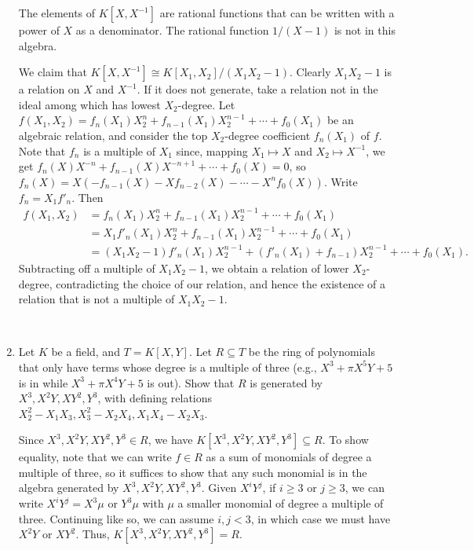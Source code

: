 \documentclass[12pt]{amsart}
\newcommand{\solution}[1]{\ifthenelse {\equal{\displaysol}{1}} {\begin{framed}{\color{meretale}\noindent #1}\end{framed}} { \ }}
\newcommand\itemB{\stepcounter{enumi}\item[(\theenumi)]}
\begin{document}
\begin{enumerate}
\solution{The elements of $K[X,X^{-1}]$ are rational functions that can be written with a power of $X$ as a denominator. The rational function $1/(X-1)$ is not in this algebra.

We claim that $K[X,X^{-1}]\cong K[X_1,X_2]/(X_1 X_2-1)$. Clearly $X_1 X_2-1$ is a relation on $X$ and $X^{-1}$. If it does not generate, take a relation not in the ideal among which has lowest $X_2$-degree. Let $f(X_1,X_2)= f_n(X_1) X_2^n + f_{n-1}(X_1) X_2^{n-1} + \cdots + f_0(X_1)$ be an algebraic relation, and consider the top $X_2$-degree coefficient $f_n(X_1)$ of $f$. Note that $f_n$ is a multiple of $X_1$ since, mapping $X_1\mapsto X$ and $X_2\mapsto X^{-1}$, we get $f_n(X) X^{-n} + f_{n-1}(X) X^{-n+1} + \cdots +f_0(X)=0$, so $f_n(X) = X(-f_{n-1}(X) - X f_{n-2}(X) - \cdots - X^n f_0(X))$. Write $f_n = X_1 f'_n$. Then 
\[ \begin{aligned}
f(X_1,X_2)&= f_n(X_1) X_2^n + f_{n-1}(X_1) X_2^{n-1} + \cdots + f_0(X_1) \\
&= X_1 f'_n(X_1) X_2^n + f_{n-1}(X_1) X_2^{n-1} + \cdots + f_0(X_1) \\ 
&= (X_1 X_2 - 1) f'_n(X_1) X_2^{n-1} + (f'_n(X_1) + f_{n-1}) X_2^{n-1} + \cdots + f_0(X_1).
\end{aligned}\]
Subtracting off a multiple of $X_1 X_2 - 1$, we obtain a relation of lower $X_2$-degree, contradicting the choice of our relation, and hence the existence of a relation that is not a multiple of $X_1 X_2 - 1$.
}



\itemB Let $K$ be a field, and $T=K[X,Y]$. Let $R\subseteq T$ be the ring of polynomials that only have terms whose degree is a multiple of three (e.g., $X^3+\pi X^5Y+5$ is in while $X^3 + \pi X^4Y+5$ is out). Show that  $R$ is generated by $X^3,X^2Y,XY^2,Y^3$, with defining relations ${X_2^2-X_1X_3}, {X_3^2-X_2X_4},{X_1X_4-X_2X_3}$.

\solution{ Since $X^3,X^2Y,XY^2,Y^3\in R$, we have $K[X^3,X^2Y,XY^2,Y^3] \subseteq R$. To show equality, note that we can write $f\in R$ as a sum of monomials of degree a multiple of three, so it suffices to show that any such monomial is in the algebra generated by $X^3,X^2Y,XY^2,Y^3$. Given $X^i Y^j$, if $i\geq 3$ or $j\geq 3$, we can write $X^i Y^j= X^3 \mu$ or $Y^3 \mu$ with $\mu$ a smaller monomial of degree a multiple of three. Continuing like so, we can assume $i,j<3$, in which case we must have $X^2 Y$ or $XY^2$. Thus, $K[X^3,X^2Y,XY^2,Y^3] =R$.

}
\end{enumerate}
\end{document}
